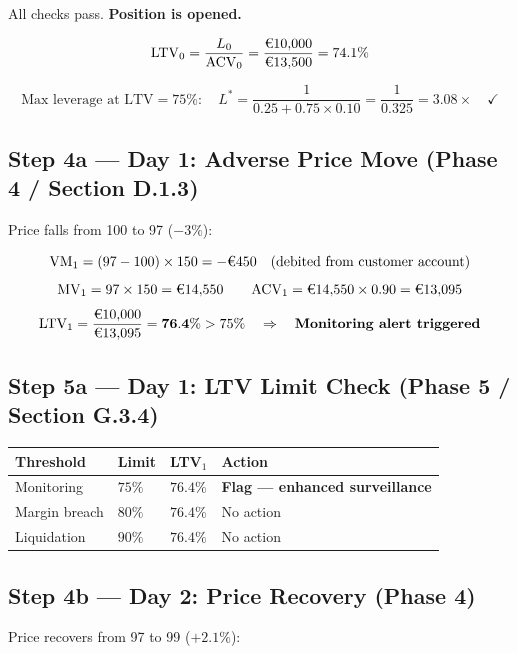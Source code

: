 \documentclass[9pt, a4paper]{extarticle}
\newcommand{\EUR}[1]{\ifmmode\text{\texteuro}#1\else\texteuro#1\fi}
\begin{document}
\medskip
All checks pass. \textbf{Position is opened.}

\[
    \mathrm{LTV}_0 = \frac{L_0}{\mathrm{ACV}_0}
                   = \frac{\EUR{10{,}000}}{\EUR{13{,}500}} = 74.1\%
\]

\[
    \text{Max leverage at LTV}=75\%:\quad
    L^* = \frac{1}{0.25 + 0.75 \times 0.10} = \frac{1}{0.325} = 3.08\times
    \quad \checkmark
\]

\subsection*{Step 4a — Day 1: Adverse Price Move (Phase 4 / Section D.1.3)}

Price falls from \EUR{100} to \EUR{97} ($-3\%$):

\[
    \mathrm{VM}_1 = (97 - 100) \times 150 = -\EUR{450}
    \quad \text{(debited from customer account)}
\]
\[
    \mathrm{MV}_1 = 97 \times 150 = \EUR{14{,}550}
    \qquad
    \mathrm{ACV}_1 = \EUR{14{,}550} \times 0.90 = \EUR{13{,}095}
\]
\[
    \mathrm{LTV}_1 = \frac{\EUR{10{,}000}}{\EUR{13{,}095}} = \mathbf{76.4\%}
    > 75\% \quad \Rightarrow \quad \textbf{Monitoring alert triggered}
\]

\subsection*{Step 5a — Day 1: LTV Limit Check (Phase 5 / Section G.3.4)}

\begin{tabularx}{\linewidth}{llll}
\toprule
\textbf{Threshold} & \textbf{Limit} & \textbf{LTV$_1$} & \textbf{Action} \\
\midrule
Monitoring  & $75\%$ & $76.4\%$ & \textbf{Flag — enhanced surveillance} \\
Margin breach & $80\%$ & $76.4\%$ & No action \\
Liquidation & $90\%$ & $76.4\%$ & No action \\
\bottomrule
\end{tabularx}

\subsection*{Step 4b — Day 2: Price Recovery (Phase 4)}

Price recovers from \EUR{97} to \EUR{99} ($+2.1\%$):
\end{document}
